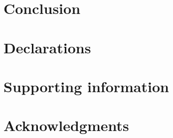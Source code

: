 \documentclass[10pt,letterpaper]{article}
\begin{document}
\section*{Conclusion}


\section*{Declarations}


\section*{Supporting information}


\section*{Acknowledgments}


\nolinenumbers


\end{document}
